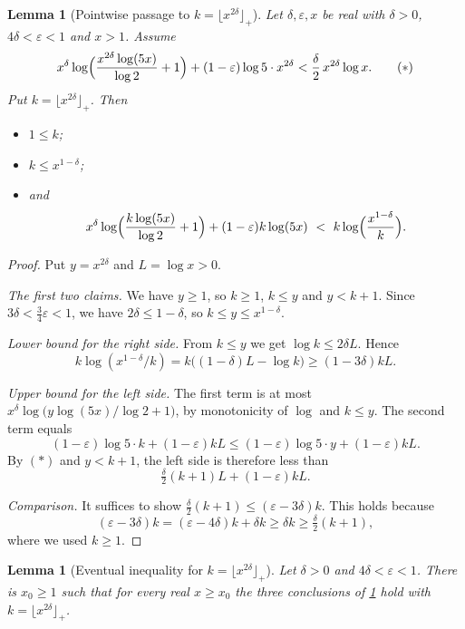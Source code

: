 \documentclass[11pt]{article}
\newtheorem{lemma}[theorem]{Lemma}
\theoremstyle{definition}
\theoremstyle{remark}
\newcommand{\floorp}[1]{\lfloor #1\rfloor_{+}}
\begin{document}
\begin{lemma}[Pointwise passage to $k=\floorp{x^{2\delta}}$]\label{lem:asymp_log_ineq_pointwise}
Let $\delta,\varepsilon,x$ be real with $\delta>0$, $4\delta<\varepsilon<1$ and $x>1$. Assume
\[
x^{\delta}\log\Bigl(\frac{x^{2\delta}\log(5x)}{\log2}+1\Bigr)+(1-\varepsilon)\log5\cdot x^{2\delta}<\frac{\delta}{2}\,x^{2\delta}\log x. \tag{$\ast$}
\]
Put $k=\floorp{x^{2\delta}}$. Then
\begin{itemize}
\item $1\le k$;
\item $k\le x^{1-\delta}$;
\item and
\[
x^{\delta}\log\Bigl(\frac{k\log(5x)}{\log2}+1\Bigr)+(1-\varepsilon)k\log(5x)\ <\ k\log\Bigl(\frac{x^{1-\delta}}{k}\Bigr).
\]
\end{itemize}
\end{lemma}

\begin{proof}
Put $y=x^{2\delta}$ and $L=\log x>0$.

\emph{The first two claims.} We have $y\ge1$, so $k\ge1$, $k\le y$ and $y<k+1$. Since $3\delta<\tfrac34\varepsilon<1$, we have $2\delta\le1-\delta$, so $k\le y\le x^{1-\delta}$.

\emph{Lower bound for the right side.} From $k\le y$ we get $\log k\le 2\delta L$. Hence
\[
k\log(x^{1-\delta}/k)=k\bigl((1-\delta)L-\log k\bigr)\ge(1-3\delta)kL.
\]

\emph{Upper bound for the left side.} The first term is at most $x^\delta\log\bigl(y\log(5x)/\log2+1\bigr)$, by monotonicity of $\log$ and $k\le y$. The second term equals
\[
(1-\varepsilon)\log5\cdot k+(1-\varepsilon)kL\le(1-\varepsilon)\log5\cdot y+(1-\varepsilon)kL .
\]
By $(\ast)$ and $y<k+1$, the left side is therefore less than
\[
\tfrac{\delta}{2}(k+1)L+(1-\varepsilon)kL .
\]

\emph{Comparison.} It suffices to show $\tfrac\delta2(k+1)\le(\varepsilon-3\delta)k$. This holds because
\[
(\varepsilon-3\delta)k=(\varepsilon-4\delta)k+\delta k\ge\delta k\ge\tfrac\delta2(k+1),
\]
where we used $k\ge1$.
\end{proof}

\begin{lemma}[Eventual inequality for $k=\floorp{x^{2\delta}}$]\label{lem:asymp_log_ineq}
Let $\delta>0$ and $4\delta<\varepsilon<1$. There is $x_0\ge1$ such that for every real $x\ge x_0$ the three conclusions of \cref{lem:asymp_log_ineq_pointwise} hold with $k=\floorp{x^{2\delta}}$.
\end{lemma}
\end{document}

